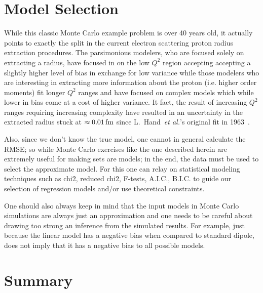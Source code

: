 \documentclass[10pt,aps,prc,twocolumn]{revtex4-1}
\begin{document}
%
%

\section{Model Selection}

While this classic Monte Carlo example problem is over 40 years old, it actually points to exactly the split in 
the current electron scattering proton radius extraction procedures.     The parsimonious modelers, who are 
focused solely on extracting a radius, have focused in on the low $Q^2$ region accepting accepting a slightly higher 
level of bias in exchange for low variance while those modelers who are interesting in extracting more information 
about the proton (i.e. higher order moments) fit longer $Q^2$ ranges and have
focused on complex models which while lower in bias come at a cost of higher variance.  
It fact, the result of increasing $Q^2$ ranges requiring increasing complexity have resulted in
an uncertainty in the extracted radius 
stuck at $\approx \unit[0.01]{fm}$ since L.~Hand~\textit{et al.}'s original fit in 1963~\cite{Hand:1963zz}.

Also, since we don't know the true model, one cannot in general calculate the RMSE; so while Monte Carlo exercises 
like the one described herein are extremely useful for making sets are models; in the end, the data must be used 
to select the approximate model. 
For this one can relay on statistical modeling techniques such as chi2, reduced chi2, F-tests, A.I.C., B.I.C. 
to guide our selection of regression models and/or use theoretical constraints.

One should also always keep in mind that the input models in Monte Carlo simulations are always just an approximation
and one needs to be careful about drawing too strong an inference from the simulated results. 
For example, just because the linear model has a negative bias when compared to standard dipole, does not imply that 
it has a negative bias to all possible models.


\section{Summary}
\end{document}
